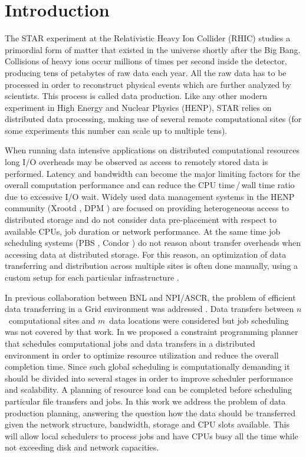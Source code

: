 \documentclass{svjour3}                     %
\begin{document}
\section{Introduction}
\label{intro}
The STAR experiment at the Relativistic Heavy Ion Collider (RHIC) studies a
primordial form of matter that existed in the universe shortly after the Big
Bang. Collisions of heavy ions occur millions of times per second inside the
detector, producing tens of petabytes of raw data each year. All the raw data
has to be processed in order to reconstruct physical events which are
further analyzed by scientists. This process is called data production.  Like
any other modern experiment in High Energy and Nuclear Physics (HENP), STAR \cite{STAR} relies on distributed data processing, making use of several remote computational sites
(for some experiments this number can scale up to multiple tens).

When running data intensive applications on distributed computational
resources long I/O overheads may be observed as access to remotely stored data
is performed. Latency and bandwidth can become the major limiting factors for
the overall computation performance and can reduce the CPU time\,/\,wall time 
ratio due to excessive I/O wait. 
Widely used data management systems in the HENP community
(Xrootd \cite{Xrootd}, DPM \cite{DPM}) are focused on providing heterogeneous access to distributed
storage and do not consider data pre-placement with respect to available CPUs,
job duration or network performance. At the same time job scheduling systems
(PBS \cite{PBS}, Condor \cite{Torque}) do not reason about transfer overheads when accessing data at
distributed storage. For this reason, an optimization of data transferring and
distribution across multiple sites is often done manually, using a custom
setup for each particular infrastructure \cite{Balewski}. 

In previous collaboration between BNL and NPI/ASCR, the problem of
efficient data transferring in a Grid environment was addressed \cite{Zerola}.
Data transfers between $n$~computational sites and $m$~data locations were
considered but job scheduling was not covered
by that work. In \cite{ACAT_cp} we
proposed a constraint programming planner that schedules computational jobs
and data transfers in a distributed environment in order to optimize resource
utilization and reduce the overall completion time. Since such global
scheduling is computationally demanding it should be divided into several
stages in order to improve scheduler performance and scalability. A planning of
resource load can be completed before scheduling particular file
transfers and jobs. In this work we address the problem of data production
planning, answering the question how the data should be transferred given the
network structure, bandwidth, storage and CPU slots available. This will allow
local schedulers to process jobs and have CPUs busy all the time while not
exceeding disk and network capacities.
\end{document}
